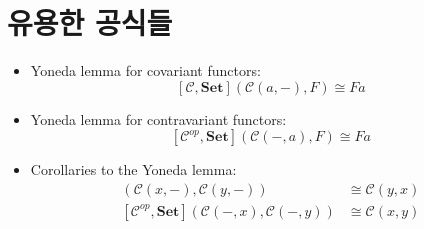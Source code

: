 \documentclass[DaoFP]{subfiles}
\begin{document}
\section{유용한 공식들}
\begin{itemize}
\item Yoneda lemma for covariant functors:
\[ [\mathcal{C}, \mathbf{Set}]( \mathcal{C}(a, -), F) \cong F a \]
\item Yoneda lemma for contravariant functors:
\[ [\mathcal{C}^{op}, \mathbf{Set}]( \mathcal{C}(-, a), F) \cong F a \]
\item Corollaries to the Yoneda lemma:
\begin{align*}
 [\mathcal{C}, \mathbf{Set}]( \mathcal{C}(x, -), \mathcal{C}(y, -)) &\cong \mathcal{C}(y, x) \\
 [\mathcal{C}^{op}, \mathbf{Set}]( \mathcal{C}(-, x), \mathcal{C}(-, y)) &\cong \mathcal{C}(x, y)
\end{align*}

\end{itemize}
\end{document}
